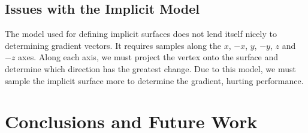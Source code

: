 \documentclass[conference]{acmsiggraph}
\begin{document}
\subsection{Issues with the Implicit Model}
The model used for defining implicit surfaces does not lend itself nicely to
determining gradient vectors. It requires samples along the $x$, $-x$, $y$,
$-y$, $z$ and $-z$ axes. Along each axis, we must project the vertex onto
the surface and determine which direction has the greatest change. Due to this
model, we must sample the implicit surface more to determine the gradient,
hurting performance.


\section{Conclusions and Future Work}




\end{document}
